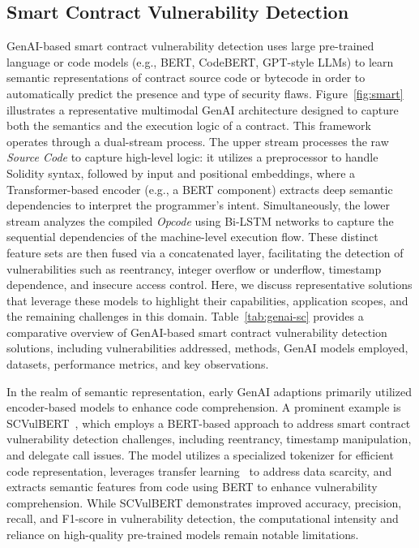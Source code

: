 \documentclass[5p,twocolumn]{elsarticle}
\begin{document}
\subsection{Smart Contract Vulnerability Detection}
GenAI-based smart contract vulnerability detection uses large pre-trained language or code models (e.g., BERT, CodeBERT, GPT-style LLMs) to learn semantic representations of contract source code or bytecode in order to automatically predict the presence and type of security flaws. Figure~\ref{fig:smart} illustrates a representative multimodal GenAI architecture designed to capture both the semantics and the execution logic of a contract. This framework operates through a dual-stream process. The upper stream processes the raw \emph{Source Code} to capture high-level logic: it utilizes a preprocessor to handle Solidity syntax, followed by input and positional embeddings, where a Transformer-based encoder (e.g., a BERT component) extracts deep semantic dependencies to interpret the programmer's intent. Simultaneously, the lower stream analyzes the compiled \emph{Opcode} using Bi-LSTM networks to capture the sequential dependencies of the machine-level execution flow. These distinct feature sets are then fused via a concatenated layer, facilitating the detection of vulnerabilities such as reentrancy, integer overflow or underflow, timestamp dependence, and insecure access control. Here, we discuss representative solutions that leverage these models to highlight their capabilities, application scopes, and the remaining challenges in this domain. Table~\ref{tab:genai-sc} provides a comparative overview of GenAI-based smart contract vulnerability detection solutions, including vulnerabilities addressed, methods, GenAI models employed, datasets, performance metrics, and key observations. 

In the realm of semantic representation, early GenAI adaptions primarily utilized encoder-based models to enhance code comprehension. A prominent example is SCVulBERT~\cite{zeng2023high}, which employs a BERT-based approach to address smart contract vulnerability detection challenges, including reentrancy, timestamp manipulation, and delegate call issues.
%
The model utilizes a specialized tokenizer for efficient code representation, leverages transfer learning~\cite{zhuang2020comprehensive} to address data scarcity, and extracts semantic features from code using BERT to enhance vulnerability comprehension. While SCVulBERT demonstrates improved accuracy, precision, recall, and F1-score in vulnerability detection, the computational intensity and reliance on high-quality pre-trained models remain notable limitations.
\end{document}
